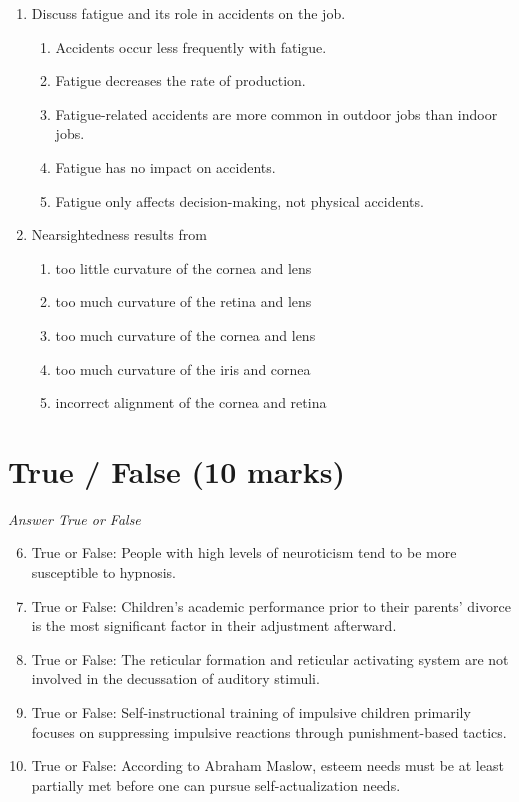 \documentclass[12pt]{article}
\begin{document}
\begin{enumerate}[label=\arabic*.]
\item Discuss fatigue and its role in accidents on the job.
\begin{enumerate}[label=(\alph*)]
    \item Accidents occur less frequently with fatigue.
    \item Fatigue decreases the rate of production.
    \item Fatigue-related accidents are more common in outdoor jobs than indoor jobs.
    \item Fatigue has no impact on accidents.
    \item Fatigue only affects decision-making, not physical accidents.
\end{enumerate}
\item Nearsightedness results from
\begin{enumerate}[label=(\alph*)]
    \item too little curvature of the cornea and lens
    \item too much curvature of the retina and lens
    \item too much curvature of the cornea and lens
    \item too much curvature of the iris and cornea
    \item incorrect alignment of the cornea and retina
\end{enumerate}
\end{enumerate}

\section*{True / False (10 marks)}
\textit{Answer True or False}
\begin{enumerate}[label=\arabic*.]
\setcounter{enumi}{5}
\item True or False: People with high levels of neuroticism tend to be more susceptible to hypnosis.
\item True or False: Children's academic performance prior to their parents' divorce is the most significant factor in their adjustment afterward.
\item True or False: The reticular formation and reticular activating system are not involved in the decussation of auditory stimuli.
\item True or False: Self-instructional training of impulsive children primarily focuses on suppressing impulsive reactions through punishment-based tactics.
\item True or False: According to Abraham Maslow, esteem needs must be at least partially met before one can pursue self-actualization needs.
\end{enumerate}
\end{document}
